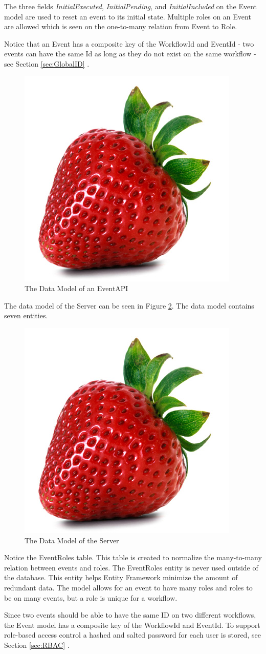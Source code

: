 The three fields \textit{InitialExecuted}, \textit{InitialPending}, and \textit{InitialIncluded} on the Event model are used to reset an event to its initial state. Multiple roles on an Event are allowed which is seen on the one-to-many relation from Event to Role. 

Notice that an Event has a composite key of the WorkflowId and EventId - two events can have the same Id as long as they do not exist on the same workflow - see Section \ref{sec:GlobalID} .\\

\begin{figure}[h!]
\centering
\includegraphics[width=0.3\linewidth]{figures/strawberry}
\caption{\label{fig:EventAPIDataModel}The Data Model of an EventAPI}
\end{figure}

The data model of the Server can be seen in Figure \ref{fig:ServerDataModel}. The data model contains seven entities. 

\begin{figure}[h!]
\centering
\includegraphics[width=0.3\linewidth]{figures/strawberry}
\caption{\label{fig:ServerDataModel}The Data Model of the Server}
\end{figure}

Notice the EventRoles table. This table is created to normalize the many-to-many relation between events and roles. The EventRoles entity is never used outside of the database. This entity helps Entity Framework minimize the amount of redundant data. The model allows for an event to have many roles and roles to be on many events, but a role is unique for a workflow. 

Since two events should be able to have the same ID on two different workflows, the Event model has a composite key of the WorkflowId and EventId. 
To support role-based access control a hashed and salted password for each user is stored, see Section \ref{sec:RBAC} .

